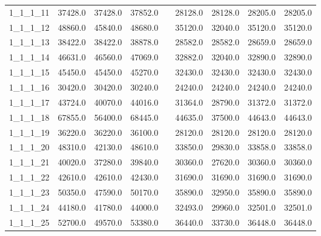 \begin{longtable}{lrrrcrrrr}
1\_1\_1\_11      &     37428.0 &       37428.0 &        37852.0 &&       28128.0 &         28128.0 &          28205.0 &          28205.0 \\
1\_1\_1\_12      &     48860.0 &       45840.0 &        48680.0 &&       35120.0 &         32040.0 &          35120.0 &          35120.0 \\
1\_1\_1\_13      &     38422.0 &       38422.0 &        38878.0 &&       28582.0 &         28582.0 &          28659.0 &          28659.0 \\
1\_1\_1\_14      &     46631.0 &       46560.0 &        47069.0 &&       32882.0 &         32040.0 &          32890.0 &          32890.0 \\
1\_1\_1\_15      &     45450.0 &       45450.0 &        45270.0 &&       32430.0 &         32430.0 &          32430.0 &          32430.0 \\
1\_1\_1\_16      &     30420.0 &       30420.0 &        30240.0 &&       24240.0 &         24240.0 &          24240.0 &          24240.0 \\
1\_1\_1\_17      &     43724.0 &       40070.0 &        44016.0 &&       31364.0 &         28790.0 &          31372.0 &          31372.0 \\
1\_1\_1\_18      &     67855.0 &       56400.0 &        68445.0 &&       44635.0 &         37500.0 &          44643.0 &          44643.0 \\
1\_1\_1\_19      &     36220.0 &       36220.0 &        36100.0 &&       28120.0 &         28120.0 &          28120.0 &          28120.0 \\
1\_1\_1\_20      &     48310.0 &       42130.0 &        48610.0 &&       33850.0 &         29830.0 &          33858.0 &          33858.0 \\
1\_1\_1\_21      &     40020.0 &       37280.0 &        39840.0 &&       30360.0 &         27620.0 &          30360.0 &          30360.0 \\
1\_1\_1\_22      &     42610.0 &       42610.0 &        42430.0 &&       31690.0 &         31690.0 &          31690.0 &          31690.0 \\
1\_1\_1\_23      &     50350.0 &       47590.0 &        50170.0 &&       35890.0 &         32950.0 &          35890.0 &          35890.0 \\
1\_1\_1\_24      &     44180.0 &       41780.0 &        44000.0 &&       32493.0 &         29960.0 &          32501.0 &          32501.0 \\
1\_1\_1\_25      &     52700.0 &       49570.0 &        53380.0 &&       36440.0 &         33730.0 &          36448.0 &          36448.0 \\

\end{longtable}
